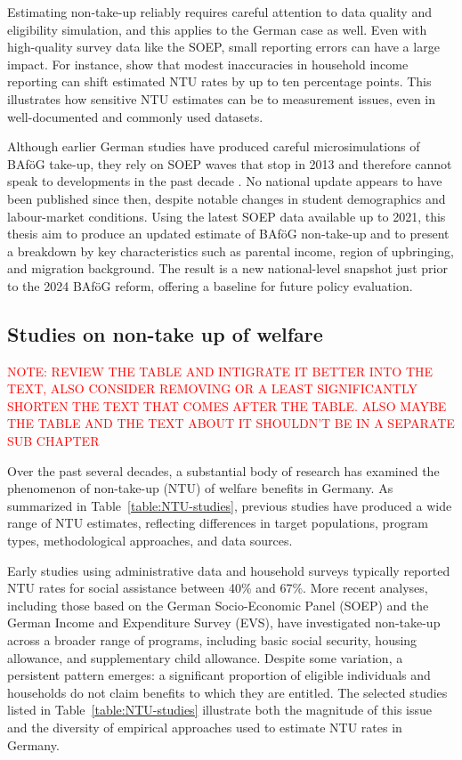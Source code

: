 Estimating non-take-up reliably requires careful attention to data quality and eligibility simulation, and this applies to the German case as well. Even with high-quality survey data like the SOEP, small reporting errors can have a large impact. For instance, \citet{frick_claim_2007} show that modest inaccuracies in household income reporting can shift estimated NTU rates by up to ten percentage points. This illustrates how sensitive NTU estimates can be to measurement issues, even in well-documented and commonly used datasets.

Although earlier German studies have produced careful microsimulations of BAföG take-up, they rely on SOEP waves that stop in 2013 and therefore cannot speak to developments in the past decade \citep{herber_non-take-up_2019, bruckmeier_new_2012}. No national update appears to have been published since then, despite notable changes in student demographics and labour-market conditions. Using the latest SOEP data available up to 2021, this thesis aim to produce an updated estimate of BAföG non-take-up and to present a breakdown by key characteristics such as parental income, region of upbringing, and migration background. The result is a new national-level snapshot just prior to the 2024 BAföG reform, offering a baseline for future policy evaluation.

\subsection{Studies on non-take up of welfare}

\textcolor{red}{NOTE: REVIEW THE TABLE AND INTIGRATE IT BETTER INTO THE TEXT, ALSO CONSIDER REMOVING OR A LEAST SIGNIFICANTLY SHORTEN THE TEXT THAT COMES AFTER THE TABLE. ALSO MAYBE THE TABLE AND THE TEXT ABOUT IT SHOULDN'T BE IN A SEPARATE SUB CHAPTER}

Over the past several decades, a substantial body of research has examined the phenomenon of non-take-up (NTU) of welfare benefits in Germany. 
As summarized in Table~\ref{table:NTU-studies}, previous studies have produced a wide range of NTU estimates, reflecting differences in target populations, program types, methodological approaches, and data sources. 

Early studies using administrative data and household surveys typically reported NTU rates for social assistance between 40\% and 67\%. 
More recent analyses, including those based on the German Socio-Economic Panel (SOEP) and the German Income and Expenditure Survey (EVS), have investigated non-take-up across a broader range of programs, including basic social security, housing allowance, and supplementary child allowance. 
Despite some variation, a persistent pattern emerges: a significant proportion of eligible individuals and households do not claim benefits to which they are entitled. 
The selected studies listed in Table~\ref{table:NTU-studies} illustrate both the magnitude of this issue and the diversity of empirical approaches used to estimate NTU rates in Germany.

